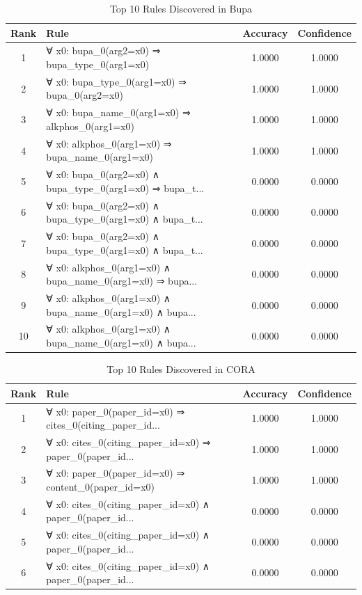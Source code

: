 \documentclass[11pt,a4paper]{article}
\begin{document}
\begin{table}[h!]
\centering
\small
\caption{Top 10 Rules Discovered in Bupa}
\label{tab:rules_Bupa}
\begin{tabular}{|c|p{5cm}|c|c|}
\hline
\textbf{Rank} & \textbf{Rule} & \textbf{Accuracy} & \textbf{Confidence} \\
\hline
1 & ∀ x0: bupa\_0(arg2=x0) ⇒ bupa\_type\_0(arg1=x0) & 1.0000 & 1.0000 \\
2 & ∀ x0: bupa\_type\_0(arg1=x0) ⇒ bupa\_0(arg2=x0) & 1.0000 & 1.0000 \\
3 & ∀ x0: bupa\_name\_0(arg1=x0) ⇒ alkphos\_0(arg1=x0) & 1.0000 & 1.0000 \\
4 & ∀ x0: alkphos\_0(arg1=x0) ⇒ bupa\_name\_0(arg1=x0) & 1.0000 & 1.0000 \\
5 & ∀ x0: bupa\_0(arg2=x0) ∧ bupa\_type\_0(arg1=x0) ⇒ bupa\_t... & 0.0000 & 0.0000 \\
6 & ∀ x0: bupa\_0(arg2=x0) ∧ bupa\_type\_0(arg1=x0) ∧ bupa\_t... & 0.0000 & 0.0000 \\
7 & ∀ x0: bupa\_0(arg2=x0) ∧ bupa\_type\_0(arg1=x0) ∧ bupa\_t... & 0.0000 & 0.0000 \\
8 & ∀ x0: alkphos\_0(arg1=x0) ∧ bupa\_name\_0(arg1=x0) ⇒ bupa... & 0.0000 & 0.0000 \\
9 & ∀ x0: alkphos\_0(arg1=x0) ∧ bupa\_name\_0(arg1=x0) ∧ bupa... & 0.0000 & 0.0000 \\
10 & ∀ x0: alkphos\_0(arg1=x0) ∧ bupa\_name\_0(arg1=x0) ∧ bupa... & 0.0000 & 0.0000 \\
\hline
\end{tabular}
\end{table}

\begin{table}[h!]
\centering
\small
\caption{Top 10 Rules Discovered in CORA}
\label{tab:rules_CORA}
\begin{tabular}{|c|p{5cm}|c|c|}
\hline
\textbf{Rank} & \textbf{Rule} & \textbf{Accuracy} & \textbf{Confidence} \\
\hline
1 & ∀ x0: paper\_0(paper\_id=x0) ⇒ cites\_0(citing\_paper\_id... & 1.0000 & 1.0000 \\
2 & ∀ x0: cites\_0(citing\_paper\_id=x0) ⇒ paper\_0(paper\_id... & 1.0000 & 1.0000 \\
3 & ∀ x0: paper\_0(paper\_id=x0) ⇒ content\_0(paper\_id=x0) & 1.0000 & 1.0000 \\
4 & ∀ x0: cites\_0(citing\_paper\_id=x0) ∧ paper\_0(paper\_id... & 0.0000 & 0.0000 \\
5 & ∀ x0: cites\_0(citing\_paper\_id=x0) ∧ paper\_0(paper\_id... & 0.0000 & 0.0000 \\
6 & ∀ x0: cites\_0(citing\_paper\_id=x0) ∧ paper\_0(paper\_id... & 0.0000 & 0.0000 \\
\hline
\end{tabular}
\end{table}
\end{document}
